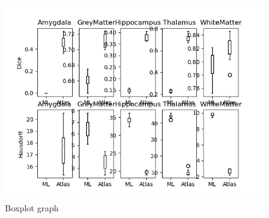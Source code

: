 \lipsum[3] %

\begin{figure}[h!]
	\centering
	\includegraphics[width = .45 \textwidth]{img/boxplot}
	\caption{Boxplot graph}
	\label{fig:boxplot}
\end{figure}